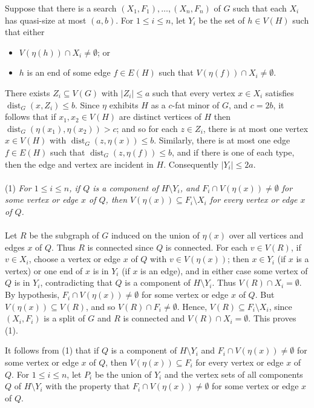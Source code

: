\documentclass[titlepage,11pt]{article}
\def\LL{,\ldots,}
\newcommand{\dist}{\operatorname{dist}}
\begin{document}
	Suppose that there is a search $(X_1,F_1)\LL (X_n, F_n)$ of $G$ such that each $X_i$ has quasi-size at most $(a,b)$.
	For $1\le i\le n$, let $Y_i$ be the set of $h\in V(H)$ such that either
	\begin{itemize}
		\item $V(\eta(h))\cap X_i\ne \emptyset$; or
		\item $h$ is an end of some edge $f\in E(H)$ such that $V(\eta(f))\cap X_i\ne \emptyset$.
	\end{itemize}
	There exists $Z_i\subseteq V(G)$ with $|Z_i|\le a$ such that every vertex $x\in X_i$ satisfies $\dist_G(x,Z_i)\le b$.
	Since $\eta$ exhibits $H$ as a $c$-fat minor of $G$, and $c=2b$, it follows that if $x_1,x_2\in V(H)$ are distinct vertices of $H$
	then $\dist_G(\eta(x_1),\eta(x_2))> c$; and so for each $z\in Z_i$, there is at most one vertex $x\in V(H)$ with $\dist_G(z,\eta(x))\le b$.
	Similarly, there is at most one edge $f\in E(H)$ such that $\dist_G(z,\eta(f))\le b$, and if there is one of each type, then the edge and vertex are incident in $H$. Consequently $|Y_i|\le 2a$.
	\\
	\\
	(1) {\em For $1\le i\le n$, if $Q$ is a component of $H\setminus Y_i$, and $F_i\cap V(\eta(x))\ne \emptyset$
		for some vertex or edge $x$ of $Q$, then
		$V(\eta(x))\subseteq F_i\setminus X_i$ for every vertex or edge $x$ of $Q$.}
	\\
	\\
	Let $R$ be the subgraph of $G$ induced on the union of $\eta(x)$ over all vertices and edges $x$ of $Q$.
	Thus $R$ is
	connected since $Q$ is connected. For each $v\in V(R)$, if $v\in X_i$, choose a vertex or edge $x$ of $Q$ with $v\in V(\eta(x))$; then
	$x\in Y_i$ (if $x$ is a vertex) or one end of $x$ is in $Y_i$ (if $x$ is an edge), and in either case some vertex of $Q$ is in $Y_i$,
	contradicting that $Q$ is a component of $H\setminus Y_i$. Thus $V(R)\cap X_i=\emptyset$.
	By hypothesis,  $F_i\cap V(\eta(x))\ne \emptyset$
	for some vertex or edge $x$ of $Q$. But $V(\eta(x))\subseteq V(R)$, and so $V(R)\cap F_i\ne \emptyset$.
	Hence, $V(R)\subseteq F_i\setminus X_i$, since $(X_i,F_i)$ is a split of $G$ and $R$ is connected and $V(R)\cap X_i=\emptyset$. This proves (1).
	
	\bigskip
	
	It follows from (1) that if $Q$ is a component of $H\setminus Y_i$ and $F_i\cap V(\eta(x))\ne \emptyset$ for some vertex or edge $x$ 
	of $Q$, then $V(\eta(x))\subseteq F_i$ for every vertex or edge $x$ of $Q$. 
	For $1\le i\le n$, let $P_i$ be the union of $Y_i$ and the vertex sets of all components $Q$ of $H\setminus Y_i$ with the property that
	$F_i\cap V(\eta(x))\ne \emptyset$
	for some vertex or edge $x$ of $Q$. 
	
\end{document}
